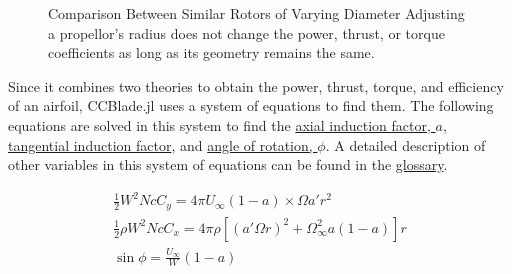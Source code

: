 \documentclass{article}
\begin{document}
\begin{figure}
  \centering
  \caption{Comparison Between Similar Rotors of Varying Diameter \newline Adjusting a propellor's radius does not change the power, thrust, or torque coefficients as long as its geometry remains the same.}
  \label{fig:1}
\end{figure}

Since it combines two theories to obtain the power, thrust, torque, and efficiency of an airfoil, CCBlade.jl uses a system of equations to find them. The following equations are solved in this system to find the  \hyperlink{a}{axial induction factor, $a$}, \hyperlink{a'}{tangential induction factor}, and \hyperlink{phi}{angle of rotation, $\phi$}. A detailed description of other variables in this system of equations can be found in the \hyperlink{BEM}{glossary}. \newline

\begin{equation}
\begin{aligned}
	\frac{1}{2} W^{2} N c C_{y} = 4 \pi U_{\infty} (1 - a) \times \Omega a' r^{2} \\
	\frac{1}{2} \rho W^{2} N c C_{x} = 4 \pi \rho [(a' \Omega r)^{2} + \Omega^{2}_{\infty} a (1 - a)] r \\
	\sin \phi = \frac{U_{\infty}}{W} (1 - a)
\end{aligned}
\end{equation}
\end{document}
